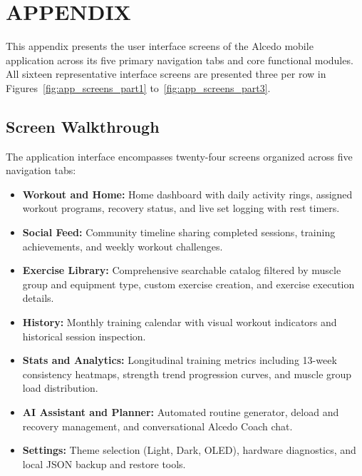 %
\clearpage
\appendix
\chapter*{APPENDIX}
\label{app:screenshots}

This appendix presents the user interface screens of the Alcedo mobile application across its five primary navigation tabs and core functional modules. All sixteen representative interface screens are presented three per row in Figures~\ref{fig:app_screens_part1} to~\ref{fig:app_screens_part3}.

\section{Screen Walkthrough}
The application interface encompasses twenty-four screens organized across five navigation tabs:
\begin{itemize}
    \item \textbf{Workout and Home:} Home dashboard with daily activity rings, assigned workout programs, recovery status, and live set logging with rest timers.
    \item \textbf{Social Feed:} Community timeline sharing completed sessions, training achievements, and weekly workout challenges.
    \item \textbf{Exercise Library:} Comprehensive searchable catalog filtered by muscle group and equipment type, custom exercise creation, and exercise execution details.
    \item \textbf{History:} Monthly training calendar with visual workout indicators and historical session inspection.
    \item \textbf{Stats and Analytics:} Longitudinal training metrics including 13-week consistency heatmaps, strength trend progression curves, and muscle group load distribution.
    \item \textbf{AI Assistant and Planner:} Automated routine generator, deload and recovery management, and conversational Alcedo Coach chat.
    \item \textbf{Settings:} Theme selection (Light, Dark, OLED), hardware diagnostics, and local JSON backup and restore tools.
\end{itemize}

